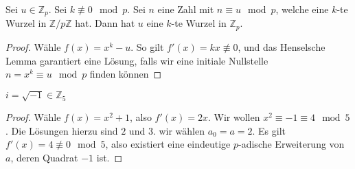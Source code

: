 \documentclass{report}
\newcommand{\bZ}{\mathbb{Z}}
\begin{document}
	\begin{application}
		Sei $u \in \bZ_p$. Sei $k \not \equiv 0 \mod p$. Sei $n$ eine Zahl mit $n \equiv u \mod p$, welche eine $k$-te Wurzel in $\bZ / p\bZ$ hat. Dann hat $u$ eine $k$-te Wurzel in $\bZ_p$.
	\end{application}
	\begin{proof}
		Wähle $f(x) = x^k - u$. So gilt $f'(x) = kx \not \equiv 0$, und das Henselsche Lemma garantiert eine Lösung, falls wir eine initiale Nullstelle $n = x^k \equiv u \mod p$ finden können
	\end{proof}
	\begin{application}
		$i = \sqrt{-1} \in \bZ_5$
	\end{application}
	\begin{proof}
		Wähle $f(x) = x^2 + 1$, also $f'(x) = 2x$. Wir wollen $x^2 \equiv -1 \equiv 4 \mod 5$. Die Lösungen hierzu sind $2$ und $3$. wir wählen $a_0 = a = 2$. Es gilt $f'(x) = 4 \not\equiv 0 \mod 5$, also existiert eine eindeutige $p$-adische Erweiterung von $a$, deren Quadrat $-1$ ist.
	\end{proof}
	\iffalse
	\section{Eine verallgemeinerte Version}
	Unsere erste Version des Henselschen Lemmas erlaubt uns nicht, Wurzeln mit Vielfachheiten größer als $1$ als die initiale Approximation zu verwenden. Wir beweisen nun eine allgemeinere Version, welche uns außerdem eine Abschätzung des $p$-adischen Abstands zwischen der Approximation und der exakten Lösung gibt:
	\begin{theorem}
		Sei 
		\begin{align*}
			F(x) = \sum_{i = 0}^n c_i x^i
		\end{align*}
		ein Polynom mit Koeffizienten $c_i \in \bZ_p$. Sei $F'(x)$ die Ableitung von $F(x)$, also
		\begin{align*}
			F'(x) = \sum_{i = 0}^{n-1} c_{i+1} x^i
		\end{align*}
		Sei außerdem $a_0 \in \bZ_p$, sodass:
		\begin{align*}
			\abs{F(a_0)}_p < \abs{F'(a_0)}_p^2 
		\end{align*}
		Dann existiert ein eindeutiges $a \in \bZ_p$, sodass:
		\begin{align*}
				F(a) &= 0\\
				\abs{a - a_0}_p & = \abs{\frac{F(a_0)}{F'(a_0)}}_p < \abs{F'(a)}_p\\
				\abs{F'(a)}_p &= \abs{F'(a_0)}_p
		\end{align*}
	\end{theorem}
	\fi
	\appendix
\end{document}
